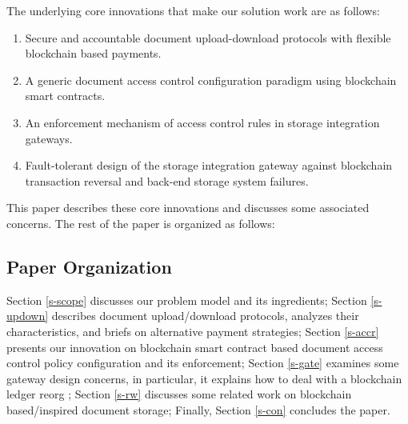 The underlying core innovations that make our solution work are as follows:
\begin{enumerate}
\item Secure and accountable document upload-download protocols with flexible blockchain based payments.
\item A generic document access control configuration paradigm using blockchain smart contracts. 
\item An enforcement mechanism of access control rules in storage integration gateways.
\item Fault-tolerant design of the storage integration gateway against blockchain transaction reversal and back-end storage system failures.   
\end{enumerate}         
This paper describes these core innovations and discusses some associated concerns. The rest of the paper is organized as follows:

\subsection{Paper Organization}
Section \ref{s-scope} discusses our problem model and its ingredients; Section \ref{s-updown} describes document upload/download protocols, analyzes their characteristics, and briefs on alternative payment strategies; Section \ref{s-accr} presents our innovation on blockchain smart contract based document access control policy configuration and its enforcement; Section \ref{s-gate} examines some gateway design concerns, in particular, it explains how to deal with a blockchain ledger reorg \cite{reorg}; Section \ref{s-rw} discusses some related work on blockchain based/inspired document storage; Finally, Section \ref{s-con} concludes the paper.
